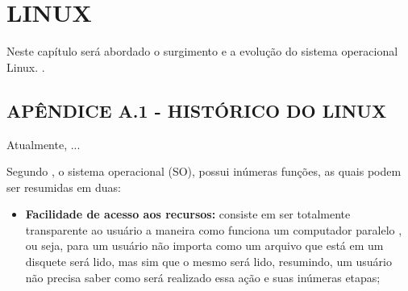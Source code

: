\chapter{LINUX}
\label{apa:linux}
\vspace{-2cm}

Neste capítulo será abordado o surgimento e a evolução do sistema operacional Linux. \cite{garver_sept70}.

\section*{\hspace{1.3cm}APÊNDICE A.1 - HISTÓRICO DO LINUX}
\label{secapa:linux}
Atualmente, ... 

Segundo , o sistema operacional (SO), possui inúmeras funções, as quais podem ser resumidas em duas:
\begin{itemize}
\item \textbf{Facilidade de acesso aos recursos:} consiste em ser totalmente transparente ao usuário a maneira como funciona um computador  paralelo  , ou seja, para um usuário não importa como um arquivo que está em um disquete será lido, mas sim que o mesmo será lido, resumindo, um usuário  não precisa saber como será realizado essa ação e suas inúmeras etapas;
\end{itemize}

%
